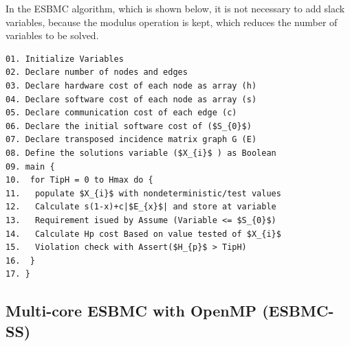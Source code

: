 In the ESBMC algorithm, which is shown below, it is not necessary to add slack variables, because the modulus operation is kept, which reduces the number of variables to be solved. 

\begin{lstlisting}[caption=Pseudocode describing sequential ESBMC, label={Pseudocode-describing-ESBMC}, mathescape]
01. Initialize Variables 
02. Declare number of nodes and edges
03. Declare hardware cost of each node as array (h)
04. Declare software cost of each node as array (s)
05. Declare communication cost of each edge (c)
06. Declare the initial software cost of ($S_{0}$)
07. Declare transposed incidence matrix graph G (E)
08. Define the solutions variable ($X_{i}$ ) as Boolean
09. main {
10.  for TipH = 0 to Hmax do {
11.   populate $X_{i}$ with nondeterministic/test values
12.   Calculate s(1-x)+c|$E_{x}$| and store at variable
13.   Requirement isued by Assume (Variable <= $S_{0}$)
14.   Calculate Hp cost Based on value tested of $X_{i}$
15.   Violation check with Assert($H_{p}$ > TipH)
16.  }
17. }
\end{lstlisting}




\subsection{Multi-core ESBMC with OpenMP (ESBMC-SS)}
\label{Multi-core-ESBMC-with-OpenMP}

